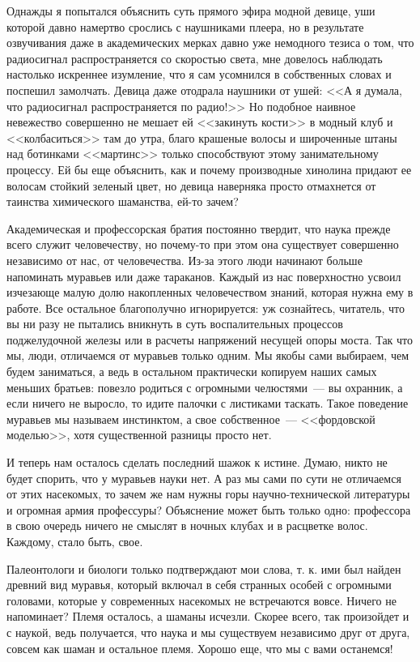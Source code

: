 \documentclass{scrbook}
\newcommand{\flqq}{<<}
\newcommand{\frqq}{>>}
\newcommand{\mdash}{~--- }
\begin{document}
Однажды я попытался объяснить суть прямого эфира модной девице, уши которой давно намертво срослись с наушниками плеера, но в результате озвучивания даже в академических мерках давно уже немодного тезиса о том, что радиосигнал распространяется со скоростью света, мне довелось наблюдать настолько искреннее изумление, что я сам усомнился в собственных словах и поспешил замолчать. Девица даже отодрала наушники от ушей: {\flqq}А я думала, что радиосигнал распространяется по радио!{\frqq} Но подобное наивное невежество совершенно не мешает ей {\flqq}закинуть кости{\frqq} в модный клуб и {\flqq}колбаситься{\frqq} там до утра, благо крашеные волосы и широченные штаны над ботинками {\flqq}мартинс{\frqq} только способствуют этому занимательному процессу. Ей бы еще объяснить, как и почему производные хинолина придают ее волосам стойкий зеленый цвет, но девица наверняка просто отмахнется от таинства химического шаманства, ей-то зачем?

Академическая и профессорская братия постоянно твердит, что наука прежде всего служит человечеству, но почему-то при этом она существует совершенно независимо от нас, от человечества. Из-за этого люди начинают больше напоминать муравьев или даже тараканов. Каждый из нас поверхностно усвоил изчезающе малую долю накопленных человечеством знаний, которая нужна ему в работе. Все остальное благополучно игнорируется: уж сознайтесь, читатель, что вы ни разу не пытались вникнуть в суть воспалительных процессов поджелудочной железы или в расчеты напряжений несущей опоры моста. Так что мы, люди, отличаемся от муравьев только одним. Мы якобы сами выбираем, чем будем заниматься, а ведь в остальном практически копируем наших самых меньших братьев: повезло родиться с огромными челюстями{\mdash}вы охранник, а если ничего не выросло, то идите палочки с листиками таскать. Такое поведение муравьев мы называем инстинктом, а свое собственное{\mdash}{\flqq}фордовской моделью{\frqq}, хотя существенной разницы просто нет.

И теперь нам осталось сделать последний шажок к истине. Думаю, никто не будет спорить, что у муравьев науки нет. А раз мы сами по сути не отличаемся от этих насекомых, то зачем же нам нужны горы научно-технической литературы и огромная армия профессуры? Объяснение может быть только одно: профессора в свою очередь ничего не смыслят в ночных клубах и в расцветке волос. Каждому, стало быть, свое.

Палеонтологи и биологи только подтверждают мои слова, т. к. ими был найден древний вид муравья, который включал в себя странных особей с огромными головами, которые у современных насекомых не встречаются вовсе. Ничего не напоминает? Племя осталось, а шаманы исчезли. Скорее всего, так произойдет и с наукой, ведь получается, что наука и мы существуем независимо друг от друга, совсем как шаман и остальное племя. Хорошо еще, что мы с вами останемся!
\end{document}
